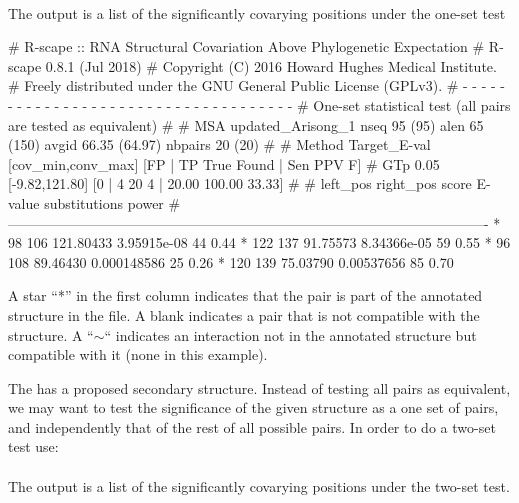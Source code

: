 \\

\noindent
The output is a list of the significantly covarying positions under the one-set test

\begin{sreoutput}
# R-scape :: RNA Structural Covariation Above Phylogenetic Expectation
# R-scape 0.8.1 (Jul 2018)
# Copyright (C) 2016 Howard Hughes Medical Institute.
# Freely distributed under the GNU General Public License (GPLv3).
# - - - - - - - - - - - - - - - - - - - - - - - - - - - - - - - - - - - -
# One-set statistical test (all pairs are tested as equivalent) 
#
# MSA updated_Arisong_1 nseq 95 (95) alen 65 (150) avgid 66.35 (64.97) nbpairs 20 (20)
#
# Method Target_E-val [cov_min,conv_max] [FP | TP True Found | Sen PPV F] 
# GTp    0.05         [-9.82,121.80]     [0 | 4 20 4 | 20.00 100.00 33.33] 
#
#       left_pos       right_pos        score          E-value       substitutions      power
#-------------------------------------------------------------------------------------------------------
*	      98	     106	121.80433	3.95915e-08	44		0.44
*	     122	     137	91.75573	8.34366e-05	59		0.55
*	      96	     108	89.46430	0.000148586	25		0.26
*	     120	     139	75.03790	0.00537656	85		0.70
\end{sreoutput}
A star ``*'' in the first column indicates that the pair is part of
the annotated structure in the  file. A
blank indicates a pair that is not compatible with the structure. A
``$\sim$`` indicates an interaction not in the annotated structure but
compatible with it (none in this example).

The  has a proposed secondary
structure.  Instead of testing all pairs as equivalent, we may want to
test the significance of the given structure as a one set of pairs,
and independently that of the rest of all possible pairs.  In order to
do a two-set test use:\\

\\

\noindent
The output is a list of the significantly covarying positions under the two-set test.

